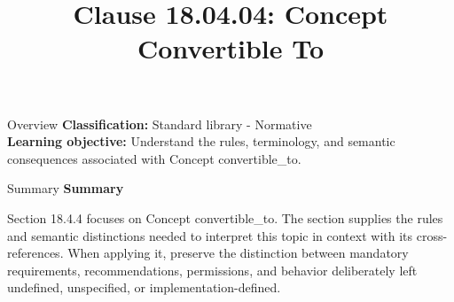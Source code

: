 \documentclass[10pt,letterpaper]{article}
\title{Clause 18.04.04: Concept Convertible To}
\author{}
\date{}
\begin{document}
\maketitle
\begin{CornellOverviewBox}{Overview}
\textbf{Classification:} Standard library - Normative\\[2pt]
\textbf{Learning objective:} Understand the rules, terminology, and semantic consequences associated with Concept convertible\_to.
\end{CornellOverviewBox}\begin{CornellSummaryBox}{Summary}
{\sffamily\bfseries\color{Accent} Summary}\par\vspace{3pt}Section 18.4.4 focuses on Concept convertible\_to. The section supplies the rules and semantic distinctions needed to interpret this topic in context with its cross-references. When applying it, preserve the distinction between mandatory requirements, recommendations, permissions, and behavior deliberately left undefined, unspecified, or implementation-defined.
\end{CornellSummaryBox}
\end{document}
